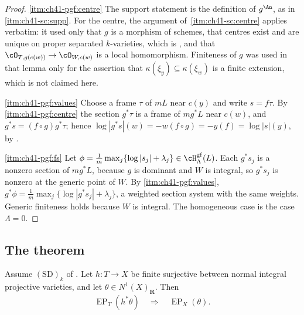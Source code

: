 \begin{proof}
\cref{itm:ch41-pgf:centre}  The support statement is the definition of
$g^{\An}$, as in
\,\cref{itm:ch41-sc:supp}.  For the
centre, the argument of
\,\cref{itm:ch41-sc:centre} applies
verbatim: it used only that $g$ is a morphism of schemes, that centres
exist and are unique on proper separated $k$-varieties, which is
, and that
$\cO_{T,g(c(w))}\to\cO_{W,c(w)}$ is a local homomorphism.  Finiteness of
$g$ was used in that lemma only for the assertion that
$\kappa(\xi_y)\subseteq\kappa(\xi_w)$ is a finite extension, which is not
claimed here.

\cref{itm:ch41-pgf:values}  Choose a frame $\tau$ of $mL$ near
$c(y)$ and write $s=f\tau$.  By \cref{itm:ch41-pgf:centre} the section
$g^*\tau$ is a frame of $mg^*L$ near $c(w)$, and
$g^*s=(f\circ g)g^*\tau$; hence
$\log|g^*s|(w)=-w(f\circ g)=-y(f)=\log|s|(y)$, by
.

\cref{itm:ch41-pgf:fs}  Let
$\phi=\frac1m\max_j\{\log|s_j|+\lambda_j\}\in
\cH^{\mathrm{gf}}_\Lambda(L)$.  Each $g^*s_j$ is a nonzero section of
$mg^*L$, because $g$ is dominant and $W$ is integral, so
$g^*s_j$ is nonzero at the generic point of $W$.  By
\cref{itm:ch41-pgf:values},
$g^*\phi=\frac1m\max_j\{\log|g^*s_j|+\lambda_j\}$, a weighted section
system with the same weights.  Generic finiteness holds because $W$ is
integral.  The homogeneous case is the case $\Lambda=0$.
\end{proof}

\subsection{The theorem}
\label{sec:ch41-descent-theorem}

\begin{theorem}\label{thm:bj-finite-normal-descent}
Assume $\mathrm{(SD)}_k$ of .
Let $h:T\to X$ be finite surjective between normal integral projective
varieties, and let $\theta\in N^1(X)_{\mathbf R}$.  Then
\[
 \operatorname{EP}_T(h^*\theta)
 \quad\Longrightarrow\quad
 \operatorname{EP}_X(\theta).
\tag{41.37}\label{eq:bj-finite-normal-descent}
\]
\end{theorem}

